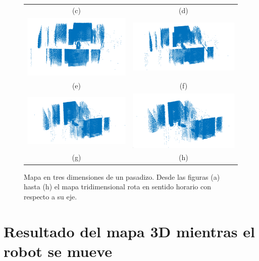 \begin{figure}
\begin{tabular}{cc}
      (c)&(d)\\
      \includegraphics[width=.52\textwidth]{images/pasadizo_4.png}&
      \includegraphics[width=.52\textwidth]{images/pasadizo_3.png}\\
      (e)&(f)\\
      \includegraphics[width=.52\textwidth]{images/pasadizo_2.png}&
      \includegraphics[width=.52\textwidth]{images/pasadizo_1.png}\\
      (g)&(h)
    \end{tabular}
  \captionsetup{font=footnotesize}
    \caption{\label{fig:pasadizo3D}Mapa en tres dimensiones de un pasadizo. Desde 
    las figuras (a) hasta (h) el mapa tridimensional rota en sentido horario con respecto
    a su eje.}
\end{figure}

\section{Resultado del mapa 3D mientras el robot se mueve}

